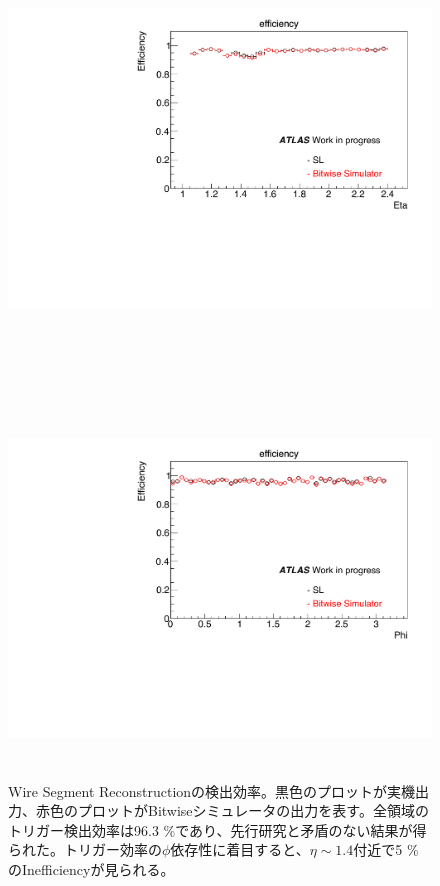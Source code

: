 \begin{figure}
    \begin{minipage}[b]{\linewidth}
    \centering
    \includegraphics[height=10cm]{fig/Test/A_SM_wire_eta.pdf}
    \end{minipage}\\
    \begin{minipage}[b]{\linewidth}
    \centering
    \includegraphics[height=10cm]{fig/Test/A_SM_wire_phi.pdf}
    \end{minipage}%
    \caption[Wire Segment Reconstructionの検出効率]{Wire Segment Reconstructionの検出効率。黒色のプロットが実機出力、赤色のプロットがBitwiseシミュレータの出力を表す。全領域のトリガー検出効率は96.3 \%であり、先行研究と矛盾のない結果が得られた。トリガー効率の$\phi$依存性に着目すると、$\eta\sim1.4$付近で5 \%のInefficiencyが見られる。}
    \label{SM_A_Wire}
\end{figure}

